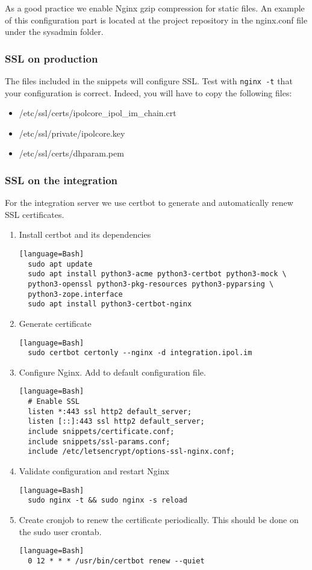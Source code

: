 \documentclass[a4paper,12pt]{article}
\begin{document}
As a good practice we enable Nginx gzip compression for static files. An example of this configuration part is located at the project repository in the nginx.conf file under the sysadmin folder.

\subsubsection{SSL on production}
The files included in the snippets will configure SSL. Test with {\tt nginx -t} that your configuration is correct. Indeed, you will have to copy the following files:
\begin{itemize}
    \item /etc/ssl/certs/ipolcore\_ipol\_im\_chain.crt
    \item /etc/ssl/private/ipolcore.key
    \item /etc/ssl/certs/dhparam.pem
\end{itemize}



\subsubsection{SSL on the integration}
For the integration server we use certbot to generate and automatically renew SSL certificates.

\begin{enumerate}
  \item Install certbot and its dependencies
  \begin{verbatim}[language=Bash]
  sudo apt update
  sudo apt install python3-acme python3-certbot python3-mock \
  python3-openssl python3-pkg-resources python3-pyparsing \
  python3-zope.interface
  sudo apt install python3-certbot-nginx
  \end{verbatim}
  \item Generate certificate
  \begin{verbatim}[language=Bash]
  sudo certbot certonly --nginx -d integration.ipol.im
  \end{verbatim}
  \item Configure Nginx. Add to default configuration file.
  \begin{verbatim}[language=Bash]
  # Enable SSL
  listen *:443 ssl http2 default_server;
  listen [::]:443 ssl http2 default_server;
  include snippets/certificate.conf;
  include snippets/ssl-params.conf;
  include /etc/letsencrypt/options-ssl-nginx.conf;
  \end{verbatim}
  \item Validate configuration and restart Nginx
  \begin{verbatim}[language=Bash]
  sudo nginx -t && sudo nginx -s reload
  \end{verbatim}
  \item Create cronjob to renew the certificate periodically. This should be done on the sudo user crontab.
  \begin{verbatim}[language=Bash]
  0 12 * * * /usr/bin/certbot renew --quiet
  \end{verbatim}

\end{enumerate}
\end{document}
